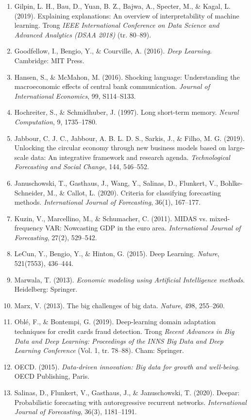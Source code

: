 \begin{enumerate}
\item Gilpin, L. H., Bau, D., Yuan, B. Z., Bajwa, A., Specter, M., \& Kagal, L. (2019). Explaining explanations: An overview of interpretability of machine learning. Trong \emph{IEEE International Conference on Data Science and Advanced Analytics (DSAA 2018)} (tr. 80--89).
\item Goodfellow, I., Bengio, Y., \& Courville, A. (2016). \emph{Deep Learning}. Cambridge: MIT Press.
\item Hansen, S., \& McMahon, M. (2016). Shocking language: Understanding the macroeconomic effects of central bank communication. \emph{Journal of International Economics}, 99, S114--S133.
\item Hochreiter, S., \& Schmidhuber, J. (1997). Long short-term memory. \emph{Neural Computation}, 9, 1735--1780.
\item Jabbour, C. J. C., Jabbour, A. B. L. D. S., Sarkis, J., \& Filho, M. G. (2019). Unlocking the circular economy through new business models based on large-scale data: An integrative framework and research agenda. \emph{Technological Forecasting and Social Change}, 144, 546--552.
\item Januschowski, T., Gasthaus, J., Wang, Y., Salinas, D., Flunkert, V., Bohlke-Schneider, M., \& Callot, L. (2020). Criteria for classifying forecasting methods. \emph{International Journal of Forecasting}, 36(1), 167--177.
\item Kuzin, V., Marcellino, M., \& Schumacher, C. (2011). MIDAS vs. mixed-frequency VAR: Nowcasting GDP in the euro area. \emph{International Journal of Forecasting}, 27(2), 529--542.
\item LeCun, Y., Bengio, Y., \& Hinton, G. (2015). Deep Learning. \emph{Nature}, 521(7553), 436--444.
\item Marwala, T. (2013). \emph{Economic modeling using Artificial Intelligence methods}. Heidelberg: Springer.
\item Marx, V. (2013). The big challenges of big data. \emph{Nature}, 498, 255--260.
\item Oblé, F., \& Bontempi, G. (2019). Deep-learning domain adaptation techniques for credit cards fraud detection. Trong \emph{Recent Advances in Big Data and Deep Learning: Proceedings of the INNS Big Data and Deep Learning Conference} (Vol. 1, tr. 78--88). Cham: Springer.
\item OECD. (2015). \emph{Data-driven innovation: Big data for growth and well-being}. OECD Publishing, Paris.
\item Salinas, D., Flunkert, V., Gasthaus, J., \& Januschowski, T. (2020). Deepar: Probabilistic forecasting with autoregressive recurrent networks. \emph{International Journal of Forecasting}, 36(3), 1181--1191.

\end{enumerate}
